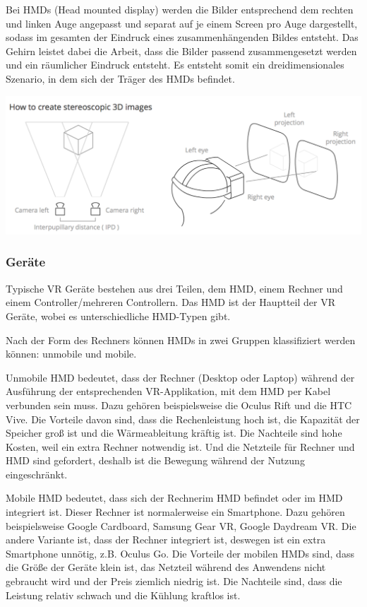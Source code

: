 Bei HMDs (Head mounted display) werden die Bilder entsprechend dem rechten und linken Auge angepasst und separat auf je einem Screen pro Auge dargestellt, sodass im gesamten der Eindruck eines zusammenhängenden Bildes entsteht. Das Gehirn leistet dabei die Arbeit, dass die Bilder passend zusammengesetzt werden und ein räumlicher Eindruck entsteht. Es entsteht somit ein dreidimensionales Szenario, in dem sich der Träger des HMDs befindet.

\includegraphics[width=\textwidth]{images/howToCreate.png}

  \subsubsection{Geräte}
  Typische VR Geräte bestehen aus drei Teilen, dem HMD, einem Rechner und einem Controller/mehreren Controllern. Das HMD ist der Hauptteil der VR Geräte, wobei es unterschiedliche HMD-Typen gibt.
  
  Nach der Form des Rechners können HMDs in zwei Gruppen klassifiziert werden können: unmobile und mobile.
  
  Unmobile HMD bedeutet, dass der Rechner (Desktop oder Laptop) während der Ausführung der entsprechenden VR-Applikation, mit dem HMD per Kabel verbunden sein muss. Dazu gehören beispielsweise die Oculus Rift\citep{31} und die HTC Vive\citep{32}. Die Vorteile davon sind, dass die Rechenleistung hoch ist, die Kapazität der Speicher groß ist und die Wärmeableitung kräftig ist. Die Nachteile sind hohe Kosten, weil ein extra Rechner notwendig ist. Und die Netzteile für Rechner und HMD sind gefordert, deshalb ist die Bewegung während der Nutzung eingeschränkt.
  
  Mobile HMD bedeutet, dass sich der \glqq Rechner\grqq im HMD befindet oder im HMD integriert ist. Dieser Rechner ist normalerweise ein Smartphone. Dazu gehören beispielsweise Google Cardboard\citep{33}, Samsung Gear VR\citep{34}, Google Daydream VR\citep{35}. Die andere Variante ist, dass der Rechner integriert ist, deswegen ist ein extra Smartphone unnötig, z.B. Oculus Go\citep{36}. Die Vorteile der mobilen HMDs sind, dass die Größe der Geräte klein ist, das Netzteil während des Anwendens nicht gebraucht wird und der Preis ziemlich niedrig ist. Die Nachteile sind, dass die Leistung relativ schwach und die Kühlung kraftlos ist.
  
